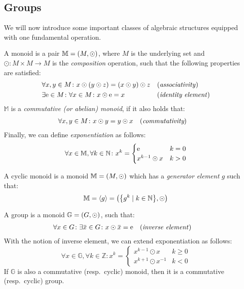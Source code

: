 \subsection{Groups}
We will now introduce some important classes of algebraic structures equipped with one fundamental 
operation. 
\begin{definition}[Monoid]
  A monoid is a pair \(\mathbb{M} = \Tuple{M, \odot} \), where \(M\) is the 
  underlying set and \(\odot\colon M \times M \to M\) is the \emph{composition} 
  operation, such that the following properties are satisfied: 
  \begin{align*}
    & \forall x,y \in M\colon x \odot \Parens*{y \odot z} = \Parens*{x \odot y} \odot z
      && \textnormal{(\emph{associativity})} \\
    & \exists \id \in M\colon \forall x \in M\colon x \odot \id = x
      && \textnormal{(\emph{identity element})}
  \end{align*}
  \(\mathbb{M}\) is a \emph{commutative (or abelian) monoid}, if it also holds that:
  \begin{align*}
    & \forall x,y \in M\colon x \odot y = y \odot x && (\emph{commutativity})
  \end{align*}
  Finally, we can define \emph{exponentiation} as follows:
  \begin{equation}\label{eq:exponentiation}    
    \forall x \in \mathbb{M}, \forall k \in \mathbb{N}\colon x^{k} = 
    \begin{cases}
      \id & k = 0 \\
      x^{k-1} \odot x & k > 0
    \end{cases}
  \end{equation}
\end{definition}

\begin{definition}
  A cyclic monoid is a monoid \(\mathbb{M} = \Tuple{M, \odot}\) which has a 
  \emph{generator element} \(g\) such that:
  \[\mathbb{M} = \gengroup{g} = \Tuple{\Set{g^k \mid k \in \mathbb{N}}, \odot} \]
\end{definition}

\begin{definition}[Group]
  A group is a monoid \(\mathbb{G} = \Tuple{G, \odot} \), such that: 
  \begin{align*}    
    & \forall x \in G\colon \exists \inv{x} \in G\colon x \odot \inv{x} = \id
    && \textnormal{(\emph{inverse element})}
  \end{align*}
  With the notion of inverse element, we can extend exponentiation as follows:
  \[
    \forall x \in \mathbb{G},\forall k \in \mathbb{Z}\colon x^k =
    \begin{cases}
      x^{k-1} \odot x & k \ge 0 \\
      x^{k+1} \odot x^{-1} & k < 0
    \end{cases}
  \]
  If \(\mathbb{G}\) is also a commutative (resp.\ cyclic) monoid, then it is a 
  commutative (resp.\ cyclic) group.
\end{definition}


